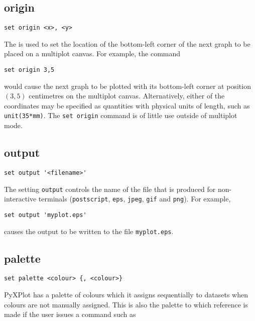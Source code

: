 \subsection{origin}

\begin{verbatim}
set origin <x>, <y>
\end{verbatim}

The  is used to set the location of the bottom-left corner
of the next graph to be placed on a multiplot canvas.  For example, the
command

\begin{verbatim}
set origin 3,5
\end{verbatim}

\noindent would cause the next graph to be plotted with its bottom-left corner
at position $(3,5)$ centimetres on the multiplot canvas. Alternatively, either
of the coordinates may be specified as quantities with physical units of
length, such as {\tt unit(35*mm)}.  The {\tt set origin} command is of little
use outside of multiplot mode.


\subsection{output}

\begin{verbatim}
set output '<filename>'
\end{verbatim}

The setting {\tt output} controls the name of the file that is produced for
non-interactive terminals ({\tt postscript}, {\tt eps}, {\tt jpeg}, {\tt gif}
and {\tt png}).  For example,

\begin{verbatim}
set output 'myplot.eps'
\end{verbatim}

\noindent causes the output to be written to the file {\tt myplot.eps}.


\subsection{palette}

\begin{verbatim}
set palette <colour> {, <colour>}
\end{verbatim}

PyXPlot has a palette of colours which it assigns sequentially to datasets when
colours are not manually assigned. This is also the palette to which reference
is made if the user issues a command such as

